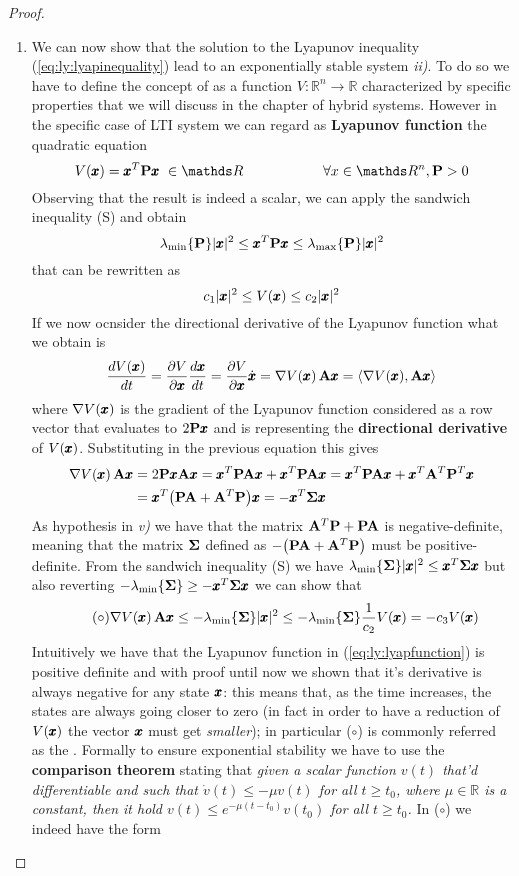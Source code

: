 \begin{proof}
\begin{enumerate}[\itshape a)]
		\item We can now show that the solution to the Lyapunov inequality (\ref{eq:ly:lyapinequality}) lead to an exponentially stable system \textit{ii)}. To do so we have to define the concept of  as a function $V: \mathds R^n \rightarrow \mathds R$ characterized by specific properties that we will discuss in the chapter of hybrid systems. However in the specific case of LTI system we can regard as \textbf{Lyapunov function} the quadratic equation
		\begin{equation} \label{eq:ly:lyapfunction}
			V(\x)= \x^T \P \x \ \in \mathds R \hspace{2cm} \forall x\in \mathds R^n, \P > 0
		\end{equation}
		Observing that the result is indeed a scalar, we can apply the sandwich inequality (S) and obtain
		\[ \lambda_{\min} \{\mathbf{P}\} |\pmb{x}|^2 \leq \pmb{x}^T\mathbf{P} \pmb{x} \leq \lambda_{\max}\{\mathbf{P}\} |\pmb{x}|^2 \]
		that can be rewritten as
		\[ c_1 |\pmb{x}|^2 \leq V(\pmb{x}) \leq c_2 |\pmb{x}|^2 \]
		If we now ocnsider the directional derivative of the Lyapunov function what we obtain is
		\[ \frac{dV(\pmb{x})}{dt} = \frac{\partial V}{\partial \pmb{x}} \frac{d\pmb{x}}{dt} = \frac{\partial V}{\partial \pmb{x}} \dot{\pmb{x}} = \nabla V(\pmb{x}) \, \mathbf{A} \pmb{x} = \langle \nabla V(\pmb{x}), \mathbf{A} \pmb{x} \rangle \]
		where $\nabla V(\pmb{x})$ is the gradient of the Lyapunov function considered as a row vector that evaluates to $2\mathbf{P} \pmb{x}$ and is representing the \textbf{directional derivative} of $V(\pmb{x})$. Substituting in the previous equation this gives
		\begin{align*}
			\nabla V(\pmb{x}) \, \mathbf{A} \pmb{x} & = 2\mathbf{P} \pmb{x} \mathbf{A} \pmb{x} = \pmb{x}^T \mathbf{P} \mathbf{A} \pmb{x} + \pmb{x}^T \mathbf{P} \mathbf{A} \pmb{x} = \pmb{x}^T \mathbf{P} \mathbf{A} \pmb{x} + \pmb{x}^T \mathbf{A}^T \mathbf{P}^T \pmb{x} \\ 
			& = \pmb{x}^T\big(\mathbf{P} \mathbf{A} + \mathbf{A}^T \mathbf{P}\big)\pmb{x} = - \pmb{x}^T \mathbf{\Sigma} \pmb{x}
		\end{align*}
		As hypothesis in \textit{v)} we have that the matrix $\mathbf{A}^T\mathbf{P} + \mathbf{P} \mathbf{A}$ is negative-definite, meaning that the matrix $\mathbf{\Sigma}$ defined as $-\big(\mathbf{P} \mathbf{A} + \mathbf{A}^T \mathbf{P}\big)$ must be positive-definite. From the sandwich inequality (S) we have $\lambda_{\min}\{\mathbf{\Sigma}\}|\pmb{x}|^2 \leq \pmb{x}^T \mathbf{\Sigma} \pmb{x}$ but also reverting $-\lambda_{\min}\{\mathbf{\Sigma}\} \geq - \pmb{x}^T \mathbf{\Sigma} \pmb{x}$ we can show that
		\[ \tag{$\circ$} \nabla V(\pmb{x}) \, \mathbf{A} \pmb{x} \leq - \lambda_{\min}\{\mathbf{\Sigma}\} |\pmb{x}|^2 \leq - \lambda_{\min}\{\mathbf{\Sigma}\} \frac 1{c_2} V(\pmb{x}) = - c_3 V(\pmb{x})  \]
		Intuitively we have that the Lyapunov function in (\ref{eq:ly:lyapfunction}) is positive definite and with proof until now we shown that it's derivative is always negative for any state $\pmb{x}$: this means that, as the time increases, the states are always going closer to zero (in fact in order to have a reduction of $V(\pmb{x})$ the vector $\pmb{x}$ must get \textit{smaller}); in particular ($\circ$) is commonly referred as the . Formally to ensure exponential stability we have to use the \textbf{comparison theorem} stating that {\itshape given a scalar function $v(t)$ that'd differentiable and such that $\dot v(t) \leq -\mu v(t)$ for all $t\geq t_0$, where $\mu \in \mathds R$ is a constant, then it hold $v(t) \leq e^{-\mu(t-t_0)} v(t_0)$ for all $t\geq t_0$.} In ($\circ$) we indeed have the form

\end{enumerate}
\end{proof}
